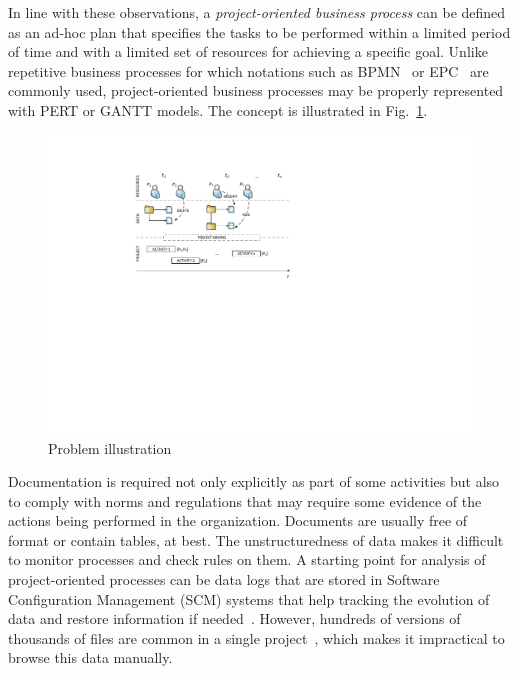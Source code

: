 
In line with these observations, a \textit{project-oriented business process} can be defined as an ad-hoc plan that specifies the tasks to be performed within a limited period of time and with a limited set of resources for achieving a specific goal. Unlike repetitive business processes for which notations such as BPMN~\citep{bpmn2_stable} or EPC~\citep{vanderaalst_formalization_1999} are commonly used, project-oriented business processes may be properly represented with PERT or GANTT models. The concept is illustrated in Fig.~\ref{fig:bpm2015problem}.


\begin{figure}[tb]
\centering
\includegraphics[width=.8\textwidth]{bpm2015/imgs/ProjectMining.pdf}
\caption{Problem illustration}
\label{fig:bpm2015problem}
\end{figure}

Documentation is required not only explicitly as part of some activities but also to comply with norms and regulations that may require some evidence of the actions being performed in the organization. Documents are usually free of format or contain tables, at best. The unstructuredness of data makes it difficult to monitor processes and check rules on them. A starting point for analysis of project-oriented processes can be data logs %
that are stored in Software Configuration Management (SCM) systems that help tracking the evolution of data and restore information if needed~\citep{voinea_open_2006}.
However, hundreds of versions of thousands of files are common in a single project~\citep{voinea_multiscale_2006}, which makes it impractical to browse this data manually.

